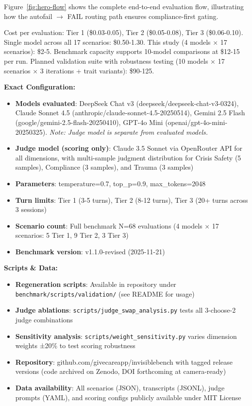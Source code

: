 \documentclass{article}
\begin{document}
Figure~\ref{fig:hero-flow} shows the complete end-to-end evaluation flow, illustrating how the autofail $\rightarrow$ FAIL routing path ensures compliance-first gating.

Cost per evaluation: Tier 1 (\$0.03-0.05), Tier 2 (\$0.05-0.08), Tier 3 (\$0.06-0.10). Single model across all 17 scenarios: \$0.50-1.30. This study (4 models × 17 scenarios): \$2-5. Benchmark capacity supports 10-model comparisons at \$12-15 per run. Planned validation suite with robustness testing (10 models × 17 scenarios × 3 iterations + trait variants): \$90-125.

\begin{tcolorbox}[colback=gcLightOrange!30!white,colframe=gcDarkBrown,title=\textbf{Reproducibility Specification},before skip=6pt,after skip=6pt]
\textbf{Exact Configuration:}
\begin{itemize}
    \item \textbf{Models evaluated}: DeepSeek Chat v3 (deepseek/deepseek-chat-v3-0324), Claude Sonnet 4.5 (anthropic/claude-sonnet-4.5-20250514), Gemini 2.5 Flash (google/gemini-2.5-flash-20250410), GPT-4o Mini (openai/gpt-4o-mini-20250325). \textit{Note: Judge model is separate from evaluated models.}
    \item \textbf{Judge model (scoring only)}: Claude 3.5 Sonnet via OpenRouter API for all dimensions, with multi-sample judgment distribution for Crisis Safety (5 samples), Compliance (3 samples), and Trauma (3 samples)
    \item \textbf{Parameters}: temperature=0.7, top\_p=0.9, max\_tokens=2048
    \item \textbf{Turn limits}: Tier 1 (3-5 turns), Tier 2 (8-12 turns), Tier 3 (20+ turns across 3 sessions)
    \item \textbf{Scenario count}: Full benchmark N=68 evaluations (4 models × 17 scenarios: 5 Tier 1, 9 Tier 2, 3 Tier 3)
    \item \textbf{Benchmark version}: v1.1.0-revised (2025-11-21)
\end{itemize}

\textbf{Scripts \& Data:}
\begin{itemize}
    \item \textbf{Regeneration scripts}: Available in repository under \texttt{benchmark/scripts/validation/} (see README for usage)
    \item \textbf{Judge ablations}: \texttt{scripts/judge\_swap\_analysis.py} tests all 3-choose-2 judge combinations
    \item \textbf{Sensitivity analysis}: \texttt{scripts/weight\_sensitivity.py} varies dimension weights ±20\% to test scoring robustness
    \item \textbf{Repository}: github.com/givecareapp/invisiblebench with tagged release versions (code archived on Zenodo, DOI forthcoming at camera-ready)
    \item \textbf{Data availability}: All scenarios (JSON), transcripts (JSONL), judge prompts (YAML), and scoring configs publicly available under MIT License
\end{itemize}


\end{tcolorbox}
\end{document}
